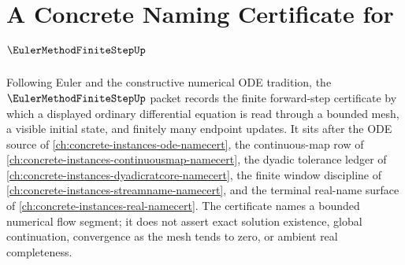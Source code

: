 \chapter{A Concrete Naming Certificate for $\EulerMethodFiniteStepUp$}
\label{ch:concrete-instances-euler-method-finite-step-namecert}

Following Euler and the constructive numerical ODE tradition, the $\EulerMethodFiniteStepUp$ packet records the finite forward-step certificate by which a displayed ordinary differential equation is read through a bounded mesh, a visible initial state, and finitely many endpoint updates. It sits after the ODE source of \autoref{ch:concrete-instances-ode-namecert}, the continuous-map row of \autoref{ch:concrete-instances-continuousmap-namecert}, the dyadic tolerance ledger of \autoref{ch:concrete-instances-dyadicratcore-namecert}, the finite window discipline of \autoref{ch:concrete-instances-streamname-namecert}, and the terminal real-name surface of \autoref{ch:concrete-instances-real-namecert}. The certificate names a bounded numerical flow segment; it does not assert exact solution existence, global continuation, convergence as the mesh tends to zero, or ambient real completeness.

